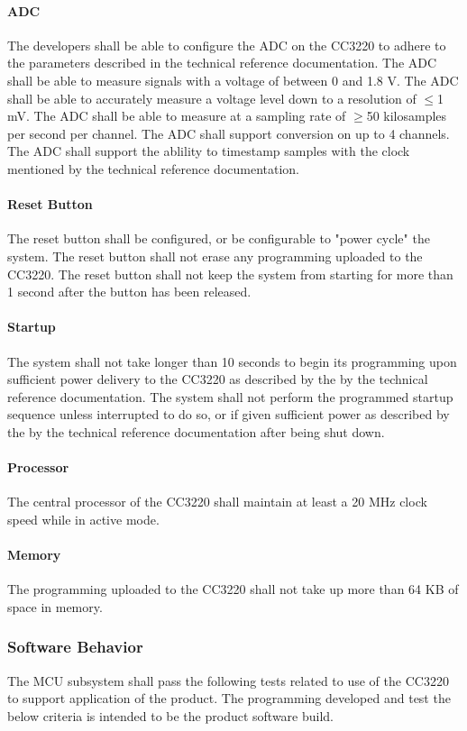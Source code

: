 \paragraph{ADC} The developers shall be able to configure the ADC on the CC3220
to adhere to the parameters described in the technical reference documentation.
The ADC shall be able to measure signals with a voltage of between 0 and 1.8 V.
The ADC shall be able to accurately measure a voltage level down to a
resolution of $\leq$1 mV. The ADC shall be able to measure at a sampling rate
of $\geq$50 kilosamples per second per channel. The ADC shall support
conversion on up to 4 channels. The ADC shall support the ablility to timestamp
samples with the clock mentioned by the technical reference documentation.

\paragraph{Reset Button} The reset button shall be configured, or be
configurable to "power cycle" the system. The reset button shall not erase
any programming uploaded to the CC3220. The reset button shall not keep the
system from starting for more than 1 second after the button has been released.

\paragraph{Startup} The system shall not take longer than 10 seconds to begin
its programming upon sufficient power delivery to the CC3220 as described by
the by the technical reference documentation. The system shall not perform
the programmed startup sequence unless interrupted to do so, or if given
sufficient power as described by the by the technical reference documentation
after being shut down.

\paragraph{Processor} The central processor of the CC3220 shall maintain at
least a 20 MHz clock speed while in active mode.

\paragraph{Memory} The programming uploaded to the CC3220 shall not take up
more than 64 KB of space in memory.

\subsubsection{Software Behavior} The MCU subsystem shall pass the following
tests related to use of the CC3220 to support application of the product. The
programming developed and test the below criteria is intended to be the
product software build.

